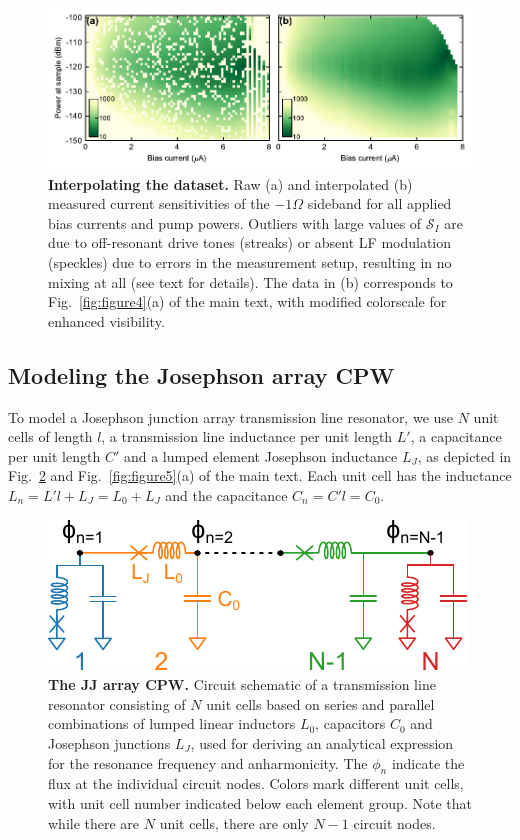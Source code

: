 \begin{figure}
	\centering
	\includegraphics[width=\linewidth]{chapter-currentdetection/figures/SM_interpolation}
	\caption{
		\textbf{Interpolating the dataset.}
		Raw (a) and interpolated (b) measured current sensitivities of the $-1\Omega$ sideband for all applied bias currents and pump powers.
		Outliers with large values of $\mathcal{S}_I$ are due to off-resonant drive tones (streaks) or absent LF modulation (speckles) due to errors in the measurement setup, resulting in no mixing at all (see text for details).
		The data in (b) corresponds to Fig.~\ref{fig:figure4}(a) of the main text, with modified colorscale for enhanced visibility.
	}
	\label{fig:fig4aclipnointerp}
\end{figure}

\subsection{Modeling the Josephson array CPW}\label{sec:optimized}

To model a Josephson junction array transmission line resonator, we use $N$ unit cells of length $l$, a transmission line inductance per unit length $L'$, a capacitance per unit length $C'$ and a lumped element Josephson inductance $L_J$, as depicted in Fig.~\ref{fig:JJCPW-sketch} and Fig.~\ref{fig:figure5}(a) of the main text.
%
Each unit cell has the inductance $L_n = L'l + L_J=L_0+L_J$ and the capacitance $C_n = C'l = C_0$.

\begin{figure}[h]
	\centering
	\includegraphics[]{chapter-currentdetection/figures/SM_anharmonicity_circuit}
	\caption{
		\textbf{The JJ array CPW.}
		Circuit schematic of a transmission line resonator consisting of $N$ unit cells based on series and parallel combinations of lumped linear inductors $L_0$, capacitors $C_0$ and Josephson junctions $L_J$, used for deriving an analytical expression for the resonance frequency and anharmonicity.
		The $\phi_n$ indicate the flux at the individual circuit nodes.
		Colors mark different unit cells, with unit cell number indicated below each element group.
		Note that while there are $N$ unit cells, there are only $N-1$ circuit nodes.
	}
	\label{fig:JJCPW-sketch}
\end{figure}

